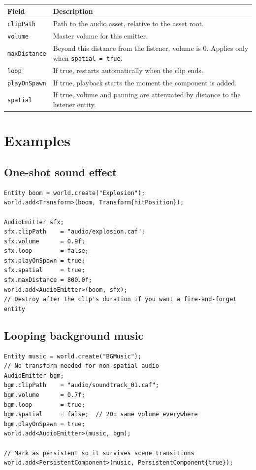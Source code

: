 \begin{longtable}{lp{9cm}}
\toprule
\textbf{Field} & \textbf{Description} \\
\midrule
\texttt{clipPath}    & Path to the audio asset, relative to the asset root. \\
\texttt{volume}      & Master volume for this emitter. \\
\texttt{maxDistance} & Beyond this distance from the listener, volume is 0. Applies only when \texttt{spatial = true}. \\
\texttt{loop}        & If true, restarts automatically when the clip ends. \\
\texttt{playOnSpawn} & If true, playback starts the moment the component is added. \\
\texttt{spatial}     & If true, volume and panning are attenuated by distance to the listener entity. \\
\bottomrule
\end{longtable}

\section{Examples}

\subsection{One-shot sound effect}

\begin{lstlisting}
Entity boom = world.create("Explosion");
world.add<Transform>(boom, Transform{hitPosition});

AudioEmitter sfx;
sfx.clipPath    = "audio/explosion.caf";
sfx.volume      = 0.9f;
sfx.loop        = false;
sfx.playOnSpawn = true;
sfx.spatial     = true;
sfx.maxDistance = 800.0f;
world.add<AudioEmitter>(boom, sfx);
// Destroy after the clip's duration if you want a fire-and-forget entity
\end{lstlisting}

\subsection{Looping background music}

\begin{lstlisting}
Entity music = world.create("BGMusic");
// No transform needed for non-spatial audio
AudioEmitter bgm;
bgm.clipPath    = "audio/soundtrack_01.caf";
bgm.volume      = 0.7f;
bgm.loop        = true;
bgm.spatial     = false;  // 2D: same volume everywhere
bgm.playOnSpawn = true;
world.add<AudioEmitter>(music, bgm);

// Mark as persistent so it survives scene transitions
world.add<PersistentComponent>(music, PersistentComponent{true});
\end{lstlisting}

